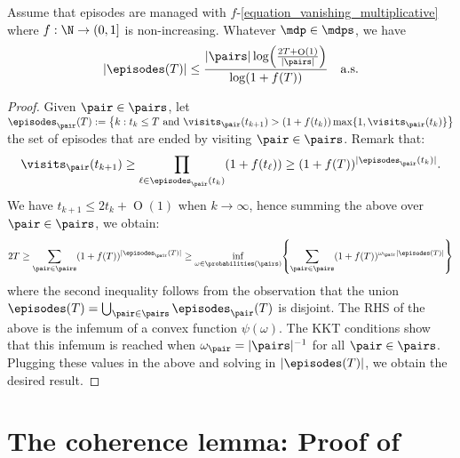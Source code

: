 \documentclass[preprint,cleveref,12pt]{colt2025}
\DeclarePairedDelimiter{\braces}{\{}{\}}	%
\DeclarePairedDelimiter{\parens}{(}{)}	%
\DeclarePairedDelimiter{\abs}{\lvert}{\rvert}	%
\DeclareMathOperator*{\OH}{\mathrm{O}}
\def\model{\mdp}
\def\models{\mdps}
\begin{document}
    \begin{lemma}
    \label{lemma_number_episodes}
        Assume that episodes are managed with $f$-\eqref{equation_vanishing_multiplicative} where $f : \N \to (0, 1]$ is non-increasing.
        Whatever $\model \in \models$, we have
        \begin{equation*}
            \abs*{\episodes(T)} 
            \le
            \frac{
                \abs{\pairs} \log\parens*{
                    \frac{2T + \OH(1)}{\abs{\pairs}}
                }
            }{
                \log(1 + f(T))
            }
            \quad
            \mathrm{a.s.}
        \end{equation*}
    \end{lemma}
    \begin{proof}
        Given $\pair \in \pairs$, let $\episodes_\pair (T) := \braces[\big]{k : t_k \le T \mathrm{~and~} \visits_\pair (t_{k+1}) > (1 + f(t_k)) \max\braces{1, \visits_\pair (t_k)}}$ the set of episodes that are ended by visiting $\pair \in \pairs$. 
        Remark that:
        \begin{equation*}
            \visits_\pair(t_{k+1})
            \ge
            \prod_{\ell \in \episodes_\pair(t_k)}
            \parens*{1 + f(t_\ell)}
            \ge
            (1 + f(T))^{\abs{\episodes_\pair(t_k)}}
            .
        \end{equation*}
        We have $t_{k+1} \le 2 t_k + \OH(1)$ when $k \to \infty$, hence summing the above over $\pair \in \pairs$, we obtain:
        \begin{equation*}
            2T
            \ge
            \sum_{\pair \in \pairs} (1 + f(T))^{\abs{\episodes_\pair(T)}}
            \ge 
            \inf_{\omega \in \probabilities(\pairs)}
            \braces*{
                \sum_{\pair \in \pairs} (1 + f(T))^{\omega_\pair \abs{\episodes(T)}}
            }
        \end{equation*}
        where the second inequality follows from the observation that the union $\episodes(T) = \bigcup_{\pair \in \pairs} \episodes_\pair (T)$ is disjoint. 
        The RHS of the above is the infemum of a convex function $\psi(\omega)$. 
        The KKT conditions show that this infemum is reached when $\omega_\pair = \abs{\pairs}^{-1}$ for all $\pair \in \pairs$. 
        Plugging these values in the above and solving in $\abs{\episodes(T)}$, we obtain the desired result.
    \end{proof}

    \clearpage
    \section{The coherence lemma: Proof of }
    \label{appendix_coherence}
    \label{section_lemma_coherence_proof}
\end{document}

